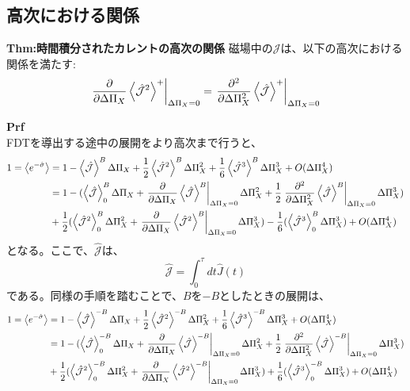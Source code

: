 \documentclass[a4paper,11pt]{jsarticle}
\begin{document}
\subsection{高次における関係}
\begin{itembox}[l]{\textbf{Thm:時間積分されたカレントの高次の関係}}
    磁場中の$\mathcal{J}$は、以下の高次における関係を満たす:
    \begin{align}
        \left.\pdv{\Delta \Pi_X} \ev{\hat{\mathcal{J}}^2}^+\right|_{\Delta \Pi_X = 0} = \left.\pdv[2]{\Delta \Pi_X} \ev{\hat{\mathcal{J}}}^+\right|_{\Delta \Pi_X = 0}
    \end{align}

\end{itembox}
\textbf{Prf}\\
FDTを導出する途中の展開をより高次まで行うと、
\begin{align}
    1=\ev{e^{-\hat{\sigma}}}&= 1-\ev{\hat{\mathcal{J}}}^B \Delta \Pi_X + \frac{1}{2}\ev{\hat{\mathcal{J}}^2}^B \Delta \Pi_X ^2+ \frac{1}{6}\ev{\hat{\mathcal{J}}^3}^B \Delta \Pi_X ^3 + O(\Delta \Pi_X ^4)\\
    &=1-(\ev{\hat{\mathcal{J}}}^B_0 \Delta \Pi_X + \left.\pdv{\Delta \Pi_X} \ev{\hat{\mathcal{J}}}^B \right|_{\Delta \Pi_X = 0} \Delta \Pi_X ^2 + \frac{1}{2}\left.\pdv[2]{\Delta \Pi_X} \ev{\hat{\mathcal{J}}}^B \right|_{\Delta \Pi_X = 0} \Delta \Pi_X ^3 )\\
    &+ \frac{1}{2}(\ev{\hat{\mathcal{J}}^2}^B_0 \Delta \Pi_X ^2 + \left.\pdv{\Delta \Pi_X} \ev{\hat{\mathcal{J}}^2}^B\right|_{\Delta \Pi_X = 0} \Delta \Pi_X ^3)- \frac{1}{6}(\ev{\hat{\mathcal{J}}^3}^B_0 \Delta \Pi_X ^3) + O(\Delta \Pi_X ^4)
\end{align}
となる。ここで、$\hat{\mathcal{J}}$は、
\begin{equation}
    \hat{\mathcal{J}} = \int_{0}^{\tau} dt \hat{J}(t)
\end{equation}
である。同様の手順を踏むことで、$B$を$-B$としたときの展開は、
\begin{align}
    1=\ev{e^{-\hat{\sigma}}}&= 1-\ev{\hat{\mathcal{J}}}^{-B} \Delta \Pi_X + \frac{1}{2}\ev{\hat{\mathcal{J}}^2}^{-B} \Delta \Pi_X ^2+ \frac{1}{6}\ev{\hat{\mathcal{J}}^3}^{-B} \Delta \Pi_X ^3 + O(\Delta \Pi_X ^4)\\
    &=1-(\ev{\hat{\mathcal{J}}}^{-B}_0 \Delta \Pi_X + \left.\pdv{\Delta \Pi_X} \ev{\hat{\mathcal{J}}}^{-B}\right|_{\Delta \Pi_X = 0} \Delta \Pi_X ^2 + \frac{1}{2}\left.\pdv[2]{\Delta \Pi_X} \ev{\hat{\mathcal{J}}}^{-B}\right|_{\Delta \Pi_X = 0} \Delta \Pi_X ^3 )\\
    &+ \frac{1}{2}(\ev{\hat{\mathcal{J}}^2}^{-B}_0 \Delta \Pi_X ^2 + \left.\pdv{\Delta \Pi_X} \ev{\hat{\mathcal{J}}^2}^{-B}\right|_{\Delta \Pi_X = 0} \Delta \Pi_X ^3)+ \frac{1}{6}(\ev{\hat{\mathcal{J}}^3}^{-B}_0 \Delta \Pi_X ^3) + O(\Delta \Pi_X ^4)
\end{align}
\end{document}
